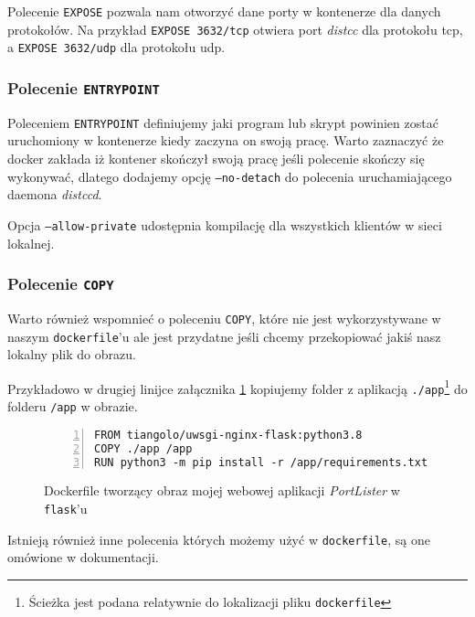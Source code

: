 \documentclass[a4paper,12pt]{article}
\begin{document}
Polecenie \texttt{EXPOSE} pozwala nam otworzyć dane porty w kontenerze dla danych protokołów. Na przykład \texttt{EXPOSE 3632/tcp} otwiera port \emph{distcc} dla protokołu tcp, a \texttt{EXPOSE 3632/udp} dla protokołu udp.

\subsubsection{Polecenie \texttt{ENTRYPOINT}}

Poleceniem \texttt{ENTRYPOINT} definiujemy jaki program lub skrypt powinien zostać uruchomiony w kontenerze kiedy zaczyna on swoją pracę. Warto zaznaczyć że docker zakłada iż kontener skończył swoją pracę jeśli polecenie skończy się wykonywać, dlatego dodajemy opcję \texttt{--no-detach} do polecenia uruchamiającego daemona \emph{distccd}.

Opcja \texttt{--allow-private} udostępnia kompilację dla wszystkich klientów w sieci lokalnej.

\subsubsection{Polecenie \texttt{COPY}}

Warto również wspomnieć o poleceniu \texttt{COPY}, które nie jest wykorzystywane w naszym \texttt{dockerfile}'u ale jest przydatne jeśli chcemy przekopiować jakiś nasz lokalny plik do obrazu.

Przykładowo w drugiej linijce załącznika \ref{dockerfile-portlister} kopiujemy folder z aplikacją \texttt{./app}\footnote{Ścieżka jest podana relatywnie do lokalizacji pliku \texttt{dockerfile}} do folderu \texttt{/app} w obrazie.

\begin{figure}[p]
    \begin{lstlisting}[frame=L,basicstyle=\footnotesize\ttfamily,numbers=left,
        morekeywords={FROM,COPY,RUN}]
FROM tiangolo/uwsgi-nginx-flask:python3.8
COPY ./app /app
RUN python3 -m pip install -r /app/requirements.txt
    \end{lstlisting}
    \caption{Dockerfile tworzący obraz mojej webowej aplikacji \emph{PortLister} w \texttt{flask}'u}

    \label{dockerfile-portlister}
\end{figure}

\vspace{1cm}

Istnieją również inne polecenia których możemy użyć w \texttt{dockerfile}, są one omówione w dokumentacji\cite{dockerfile:docs}.
\end{document}
